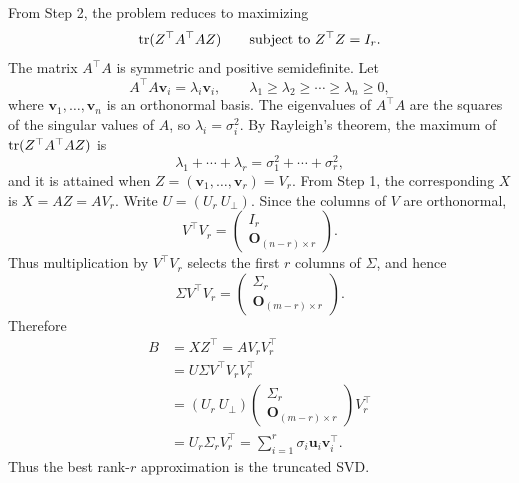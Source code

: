 \begin{pfbox}
From Step 2, the problem reduces to maximizing
\[
    \operatorname{tr}(Z^{\top}A^{\top}AZ)
    \qquad\text{subject to }Z^{\top}Z=I_r.
\]
The matrix $A^{\top}A$ is symmetric and positive semidefinite. Let
\[
    A^{\top}A\mathbf{v}_i=\lambda_i \mathbf{v}_i,
    \qquad
    \lambda_1\ge\lambda_2\ge\cdots\ge\lambda_n\ge 0,
\]
where $\mathbf{v}_1,\ldots,\mathbf{v}_n$ is an orthonormal basis. The eigenvalues of $A^{\top}A$ are the squares of the singular values of $A$, so $\lambda_i=\sigma_i^2$.
By Rayleigh's theorem, the maximum of $\operatorname{tr}(Z^{\top}A^{\top}AZ)$ is
\[
    \lambda_1+\cdots+\lambda_r
    =
    \sigma_1^2+\cdots+\sigma_r^2,
\]
and it is attained when $Z=(\mathbf{v}_1,\ldots,\mathbf{v}_r)=V_r$.
From Step 1, the corresponding $X$ is $X=AZ=AV_r$.
Write $U=(U_r\ U_{\perp})$. Since the columns of $V$ are orthonormal,
\[
    V^{\top}V_r
    =
    \begin{pmatrix}
        I_r\\
        \mathbf O_{(n-r)\times r}
    \end{pmatrix}.
\]
Thus multiplication by $V^{\top}V_r$ selects the first $r$ columns of
$\Sigma$, and hence
\[
    \Sigma V^{\top}V_r
    =
    \begin{pmatrix}
        \Sigma_r\\
        \mathbf O_{(m-r)\times r}
    \end{pmatrix}.
\]
Therefore
\[
\begin{aligned}
    B
    &=
    XZ^{\top}
    =
    AV_rV_r^{\top}\\
    &=
    U\Sigma V^{\top}V_rV_r^{\top}\\
    &=
    (U_r\ U_{\perp})
    \begin{pmatrix}
        \Sigma_r\\
        \mathbf O_{(m-r)\times r}
    \end{pmatrix}
    V_r^{\top}\\
    &=
    U_r\Sigma_rV_r^{\top}
    =
    \sum_{i=1}^r \sigma_i \mathbf{u}_i\mathbf{v}_i^{\top}.
\end{aligned}
\]
Thus the best rank-$r$ approximation is the truncated SVD.
\end{pfbox}









